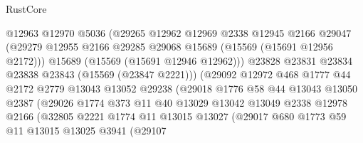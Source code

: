 \begin{lexlean}{RustCore}
\begin{coremodule}
                            @12963
                            @12970
                            @5036
                            (@29265
                              @12962
                              @12969
                              @2338
                              @12945
                              @2166
                              @29047
                              (@29279
                                @12955
                                @2166
                                @29285
                                @29068
                                @15689
                                (@15569 (@15691 @12956 @2172)))
                              @15689
                              (@15569 (@15691 @12946 @12962)))
                            @23828
                            @23831
                            @23834
                            @23838
                            @23843
                            (@15569 (@23847 @2221)))
                          (@29092
                            @12972
                            @468
                            @1777
                            @44
                            @2172
                            @2779
                            @13043
                            @13052
                            @29238
                            (@29018
                              @1776
                              @58
                              @44
                              @13043
                              @13050
                              @2387
                              (@29026
                                @1774
                                @373
                                @11
                                @40
                                @13029
                                @13042
                                @13049
                                @2338
                                @12978
                                @2166
                                (@32805
                                  @2221
                                  @1774
                                  @11
                                  @13015
                                  @13027
                                  (@29017
                                    @680
                                    @1773
                                    @59
                                    @11
                                    @13015
                                    @13025
                                    @3941
                                    (@29107

\end{coremodule}
\end{lexlean}
